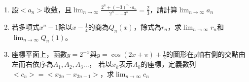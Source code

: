 \documentclass[12pt]{article}
\begin{document}
\begin{enumerate}
    \item 設$<a_n>$收斂，且$\displaystyle\lim_{n\to \infty}\frac{2^n+(-3)^n\cdot a_n}{2^n-{-3}^n}=\frac{2}{3}$，請計算$\displaystyle\lim_{n\to\infty}a_n$
    \vspace{2cm}
    \item 若多項式$x^n-1$除以$x-\frac{1}{4}$的商為$Q_n(x)$，餘式為$r_n$，求$\displaystyle\lim_{n\to\infty}r_n$和
    $\displaystyle\lim_{n\to\infty}Q_n(1)$。\vspace{2cm}
    \item 座標平面上，函數$y=2^{-x}$與$y=\cos(2x+\pi)+\frac{1}{2}$的圖形在$y$軸右側的交點由左而右依序為$A_1, A_2, A_3...$，
    若以$x_k$表示$A_k$的座標，定義數列$<c_n>=<x_{2n}-x_{2n-1}>$，求$\displaystyle\lim_{n\to\infty}c_n$\vspace{2cm}
\end{enumerate}
\end{document}
